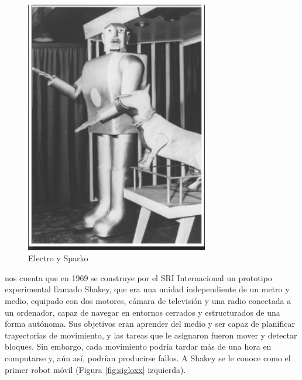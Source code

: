 \begin{figure} [h!]
	\begin{center}
		\includegraphics[width=8cm]{figs/electro-sparko.png}
	\end{center}
	\caption{Electro y Sparko} %
	\label{fig:EyS}
\end{figure}



\cite{nilsson1984shakey} nos cuenta que en 1969 se construye por el \ac{SRI} Internacional un prototipo experimental llamado Shakey, que era una unidad independiente de un metro y medio, equipado con dos motores, cámara de televisión y una radio conectada a un ordenador, capaz de navegar en entornos cerrados y estructurados de una forma autónoma. Sus objetivos eran aprender del medio y ser capaz de planificar trayectorias de movimiento, y las tareas que le asignaron fueron mover y detectar bloques. Sin embargo, cada movimiento podría tardar más de una hora en computarse y, aún así, podrían producirse fallos. A Shakey se le conoce como el primer robot móvil (Figura \ref{fig:sigloxx} izquierda). 

